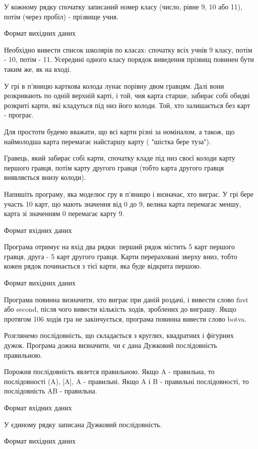 \documentclass[]{article}
\begin{document}
\begin{enumerate}
У кожному рядку спочатку записаний номер класу (число, рівне 9, 10 або 11), потім (через пробіл) - прізвище учня.

Формат вихідних даних

Необхідно вивести список школярів по класах: спочатку всіх учнів 9 класу, потім - 10, потім - 11. Усередині одного класу порядок виведення прізвищ повинен бути таким же, як на вході.

У грі в п'яницю карткова колода лунає порівну двом гравцям. Далі вони розкривають по одній верхній карті, і той, чия карта старше, забирає собі обидві розкриті карти, які кладуться під низ його колоди. Той, хто залишається без карт - програє.

Для простоти будемо вважати, що всі карти різні за номіналом, а також, що наймолодша карта перемагає найстаршу карту ( "шістка бере туза").

Гравець, який забирає собі карти, спочатку кладе під низ своєї колоди карту першого гравця, потім карту другого гравця (тобто карта другого гравця виявляється внизу колоди).

Напишіть програму, яка моделює гру в п'яницю і визначає, хто виграє. У грі бере участь 10 карт, що мають значення від 0 до 9, велика карта перемагає меншу, карта зі значенням 0 перемагає карту 9.

Формат вхідних даних

Програма отримує на вхід два рядки: перший рядок містить 5 карт першого гравця, друга - 5 карт другого гравця. Карти перераховані зверху вниз, тобто кожен рядок починається з тієї карти, яка буде відкрита першою.

Формат вихідних даних

Програма повинна визначити, хто виграє при даній роздачі, і вивести слово first або second, після чого вивести кількість ходів, зроблених до виграшу. Якщо протягом 106 ходів гра не закінчується, програма повинна вивести слово botva.

Розглянемо послідовність, що складається з круглих, квадратних і фігурних дужок. Програма дожна визначити, чи є дана Дужковий послідовність правильною.

Порожня послідовність явлется правильною. Якщо A - правильна, то послідовності (A), [A], {A} - правильні. Якщо A і B - правильні послідовності, то послідовність AB - правильна.

Формат вхідних даних

У єдиному рядку записана Дужковий послідовність.

Формат вихідних даних


\end{enumerate}
\end{document}
